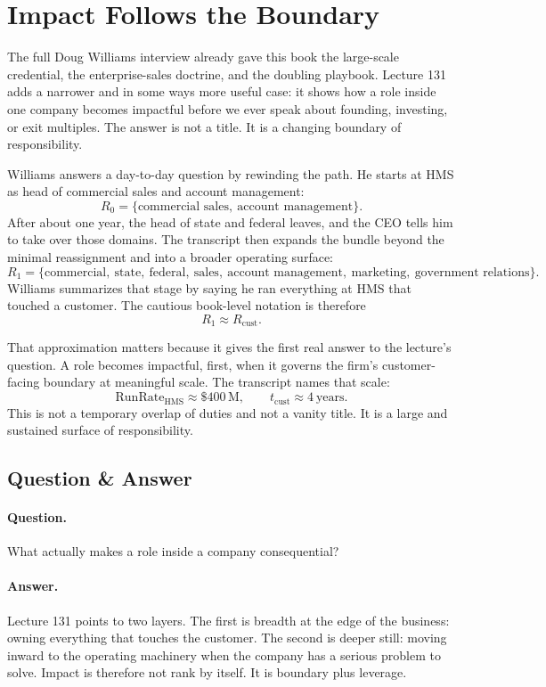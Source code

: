 \documentclass[11pt,oneside]{book}
\begin{document}
\section{Impact Follows the Boundary}

The full Doug Williams interview already gave this book the large-scale credential, the enterprise-sales doctrine, and the doubling playbook. Lecture 131 adds a narrower and in some ways more useful case: it shows how a role inside one company becomes impactful before we ever speak about founding, investing, or exit multiples. The answer is not a title. It is a changing boundary of responsibility.

Williams answers a day-to-day question by rewinding the path. He starts at HMS as head of commercial sales and account management:
\[
R_0=\{\text{commercial sales},\ \text{account management}\}.
\]
After about one year, the head of state and federal leaves, and the CEO tells him to take over those domains. The transcript then expands the bundle beyond the minimal reassignment and into a broader operating surface:
\[
R_1=
\{\text{commercial},\ \text{state},\ \text{federal},\ \text{sales},\ \text{account management},\ \text{marketing},\ \text{government relations}\}.
\]
Williams summarizes that stage by saying he ran everything at HMS that touched a customer. The cautious book-level notation is therefore
\[
R_1 \approx R_{\mathrm{cust}}.
\]

That approximation matters because it gives the first real answer to the lecture's question. A role becomes impactful, first, when it governs the firm's customer-facing boundary at meaningful scale. The transcript names that scale:
\[
\mathrm{RunRate}_{\mathrm{HMS}} \approx \$400\,\mathrm{M},
\qquad
t_{\mathrm{cust}} \approx 4\ \text{years}.
\]
This is not a temporary overlap of duties and not a vanity title. It is a large and sustained surface of responsibility.

\subsection{Question \& Answer}

\paragraph{Question.}
What actually makes a role inside a company consequential?

\paragraph{Answer.}
Lecture 131 points to two layers. The first is breadth at the edge of the business: owning everything that touches the customer. The second is deeper still: moving inward to the operating machinery when the company has a serious problem to solve. Impact is therefore not rank by itself. It is boundary plus leverage.
\end{document}
